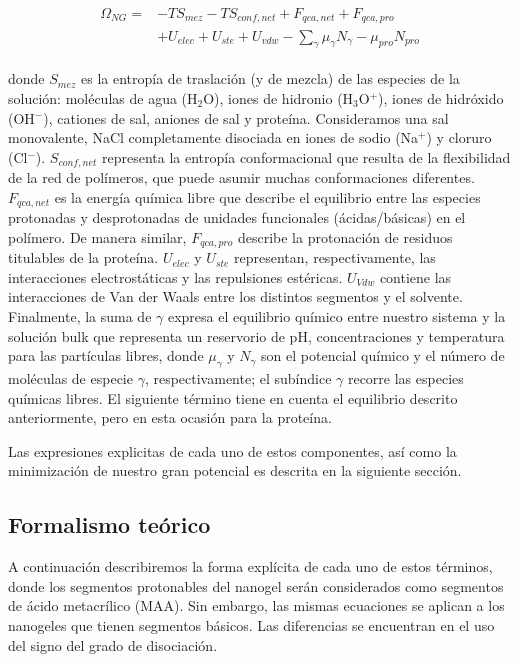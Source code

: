 \begin{align}
\begin{aligned}
\Omega_{NG}=& -TS_{mez} -TS_{conf,net} + F_{qca,net} + F_{qca,pro}\\
& + U_{elec} + U_{ste} + U_{vdw} - \sum_{\gamma}{\mu_\gamma N_\gamma} - \mu_{pro} N_{pro}
\end{aligned}
\label{eq:esf:semicano}
\end{align}


\noindent donde $S_{mez}$ es la entrop\'ia de traslaci\'on (y de mezcla) de las especies de la soluci\'on: mol\'eculas de agua (H$_2$O), iones de hidronio (H$_3$O$^+$), iones de hidr\'oxido (OH$^- $), cationes de sal, aniones de sal y prote\'ina.
Consideramos una sal monovalente, NaCl completamente disociada en iones de sodio (Na$^+$) y cloruro (Cl$^-$).
$S_{conf,net}$ representa la entrop\'ia conformacional que resulta de la flexibilidad de la red de pol\'imeros, que puede asumir muchas conformaciones diferentes.
$F_{qca,net}$ es la energ\'ia qu\'imica libre que describe el equilibrio entre las especies protonadas y desprotonadas de unidades funcionales (\'acidas/b\'asicas) en el pol\'imero.
De manera similar, $F_{qca,pro}$ describe la protonaci\'on de residuos titulables de la prote\'ina.
$U_{elec}$ y $U_{ste}$ representan, respectivamente, las interacciones electrost\'aticas y las repulsiones est\'ericas.
$U_{Vdw}$ contiene las interacciones de Van der Waals entre los distintos segmentos y el solvente.
Finalmente, la suma de $\gamma$ expresa el equilibrio qu\'imico entre nuestro sistema y la soluci\'on bulk que representa un reservorio de pH, concentraciones y temperatura para las part\'iculas libres, donde $\mu_\gamma$ y $N_\gamma$ son el potencial qu\'imico y el n\'umero de mol\'eculas de especie $\gamma$, respectivamente;
el sub\'indice $\gamma$ recorre las especies qu\'imicas libres.
El siguiente t\'ermino tiene en cuenta el equilibrio descrito anteriormente, pero en esta ocasi\'on para la prote\'ina.

Las expresiones explicitas de cada uno de estos componentes, as\'i como la minimizaci\'on de nuestro gran potencial es descrita en la siguiente secci\'on.



\subsection{Formalismo te\'orico}\label{sec:esf:tm}

A continuaci\'on describiremos la forma expl\'icita de cada uno de estos t\'erminos, donde los segmentos protonables del nanogel ser\'an considerados como segmentos de \'acido metacr\'ilico (MAA). Sin embargo, las mismas ecuaciones se aplican a los nanogeles que tienen segmentos b\'asicos. Las diferencias se encuentran en el uso del signo del grado de disociaci\'on.


